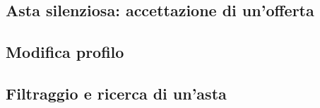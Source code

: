 {	\subsection*{Asta silenziosa: accettazione di un'offerta}
	
	\newpage

	\subsection*{Modifica profilo}
	
	\newpage

	\subsection*{Filtraggio e ricerca di un'asta}
	
} %

